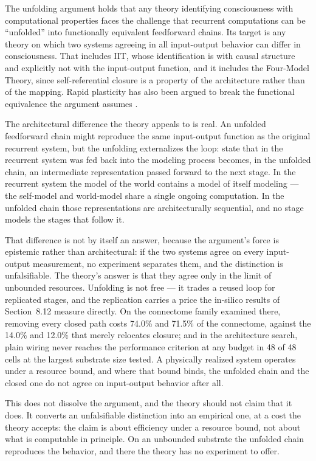 \documentclass[12pt]{article}
\newcommand{\revstart}{}
\newcommand{\revend}{}
\begin{document}
{\revstart The unfolding argument \citep{Doerig2019} holds that any theory identifying consciousness with computational properties faces the challenge that recurrent computations can be ``unfolded'' into functionally equivalent feedforward chains. Its target is any theory on which two systems agreeing in all input-output behavior can differ in consciousness. That includes IIT, whose identification is with causal structure and explicitly not with the input-output function, and it includes the Four-Model Theory, since self-referential closure is a property of the architecture rather than of the mapping. Rapid plasticity has also been argued to break the functional equivalence the argument assumes \citep{OReillyShah2026}.

The architectural difference the theory appeals to is real. An unfolded feedforward chain might reproduce the same input-output function as the original recurrent system, but the unfolding externalizes the loop: state that in the recurrent system was fed back into the modeling process becomes, in the unfolded chain, an intermediate representation passed forward to the next stage. In the recurrent system the model of the world contains a model of itself modeling --- the self-model and world-model share a single ongoing computation. In the unfolded chain those representations are architecturally sequential, and no stage models the stages that follow it.

That difference is not by itself an answer, because the argument's force is epistemic rather than architectural: if the two systems agree on every input-output measurement, no experiment separates them, and the distinction is unfalsifiable. The theory's answer is that they agree only in the limit of unbounded resources. Unfolding is not free --- it trades a reused loop for replicated stages, and the replication carries a price the in-silico results of Section~8.12 measure directly. On the connectome family examined there, removing every closed path costs 74.0\% and 71.5\% of the connectome, against the 14.0\% and 12.0\% that merely relocates closure; and in the architecture search, plain wiring never reaches the performance criterion at any budget in 48 of 48 cells at the largest substrate size tested. A physically realized system operates under a resource bound, and where that bound binds, the unfolded chain and the closed one do not agree on input-output behavior after all.

This does not dissolve the argument, and the theory should not claim that it does. It converts an unfalsifiable distinction into an empirical one, at a cost the theory accepts: the claim is about efficiency under a resource bound, not about what is computable in principle. On an unbounded substrate the unfolded chain reproduces the behavior, and there the theory has no experiment to offer.\revend}
\end{document}
